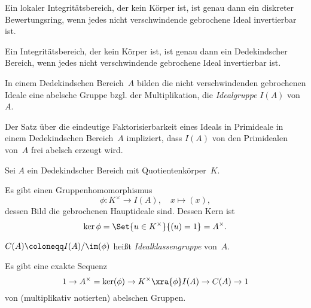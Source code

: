 \documentclass{cheat-sheet}
\begin{document}

\begin{prop}
  Ein lokaler Integritätsbereich, der kein Körper ist, ist genau dann ein diskreter Bewertungsring, wenn jedes nicht verschwindende gebrochene Ideal invertierbar ist.
\end{prop}

\begin{satz}
  Ein Integritätsbereich, der kein Körper ist, ist genau dann ein Dedekindscher Bereich, wenn jedes nicht verschwindende gebrochene Ideal invertierbar ist.
\end{satz}


\begin{kor}
  In einem Dedekindschen Bereich~$A$ bilden die nicht verschwindenden gebrochenen Ideale eine abelsche Gruppe bzgl. der Multiplikation, die \emph{Idealgruppe} $I(A)$ von~$A$.
\end{kor}

\begin{bem}
  Der Satz über die eindeutige Faktorisierbarkeit eines Ideals in Primideale in einem Dedekindschen Bereich~$A$ impliziert, dass $I(A)$ von den Primidealen von~$A$ frei abelsch erzeugt wird.
\end{bem}

\begin{defn}
  Sei $A$ ein Dedekindscher Bereich mit Quotientenkörper~$K$.
\end{defn}

\begin{bem}
  Es gibt einen Gruppenhomomorphismus
  \[
    \phi : K^{\times} \to I(A), \quad x \mapsto (x),
  \]
  dessen Bild die gebrochenen Hauptideale sind.
  Dessen Kern ist
  \[
    \ker \phi = \Set{u \in K^{\times}}{(u) = 1} = A^{\times}.
  \]
\end{bem}

\begin{defn}
  $C(A) \coloneqq I(A) / \im(\phi)$ heißt \emph{Idealklassengruppe} von~$A$.
\end{defn}

\begin{bem}
  Es gibt eine exakte Sequenz
  \[
    1 \to A^{\times} = \ker(\phi) \to K^{\times} \xra{\phi} I(A) \to C(A) \to 1
  \]
  von (multiplikativ notierten) abelschen Gruppen.
\end{bem}
\end{document}
